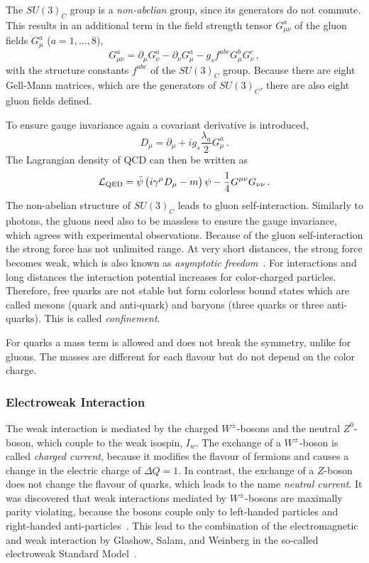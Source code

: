 The $SU(3)_C$ group is a \emph{non-abelian} group, since its generators do not commute.
This results in an additional term in the field strength tensor $G_{\mu\nu}^a$ of the gluon fields $G_\mu^a$ ($a = 1, \ldots, 8$),
\begin{equation}
    G_{\mu\nu}^a = \partial_\mu G_\nu^a -  \partial_\nu G_\mu^a - g_s f^{abc} G_\mu^b G_\nu^c \,,
\end{equation}
with the structure constants $f^{abc}$ of the $SU(3)_C$ group.
Because there are eight Gell-Mann matrices, which are the generators of $SU(3)_C$, there are also eight gluon fields defined.

To ensure gauge invariance again a covariant derivative is introduced,
\begin{equation}
    D_\mu = \partial_\mu + i g_s \frac{\lambda_a}{2} G_\mu^a \,.
\end{equation}
The Lagrangian density of QCD can then be written as
\begin{equation}
    \mathcal{L}_\text{QED} = \bar{\psi} \left( i \gamma^\mu D_\mu -m \right) \psi - \frac{1}{4} G^{\mu\nu} G_{\nu\nu} \,.
\end{equation}
The non-abelian structure of $SU(3)_C$ leads to gluon self-interaction.
Similarly to photons, the gluons need also to be massless to ensure the gauge invariance, which agrees with experimental observations.
Because of the gluon self-interaction the strong force has not unlimited range.
At very short distances, the strong force becomes weak, which is also known as \emph{asymptotic freedom}~\cite{AsymFreedom1,AsymFreedom2}.
For interactions and long distances the interaction potential increases for color-charged particles.
Therefore, free quarks are not stable but form colorless bound states which are called mesons (quark and anti-quark) and
baryons (three quarks or three anti-quarks).
This is called \emph{confinement}.

For quarks a mass term is allowed and does not break the symmetry, unlike for gluons.
The masses are different for each flavour but do not depend on the color charge.

\subsubsection{Electroweak Interaction}

The weak interaction is mediated by the charged $W^\pm$-bosons and the neutral $Z^0$-boson, which couple to the weak
isospin, $I_w$.
The exchange of a $W^\pm$-boson is called \emph{charged current}, because it modifies the flavour of fermions and causes a change in the electric charge of $\Delta Q = 1$.
In contrast, the exchange of a $Z$-boson does not change the flavour of quarks, which leads to the name \emph{neutral current}.
It was discovered that weak interactions mediated by $W^\pm$-bosons are maximally parity violating, because the bosons couple only to
left-handed particles and right-handed anti-particles~\cite{PhysRev.104.254,PhysRev.105.1413}.
This lead to the combination of the electromagnetic and weak interaction by Glashow, Salam, and Weinberg in the
so-called electroweak Standard Model~\cite{Glashow1961,Salam1959,Weinberg1967}.

